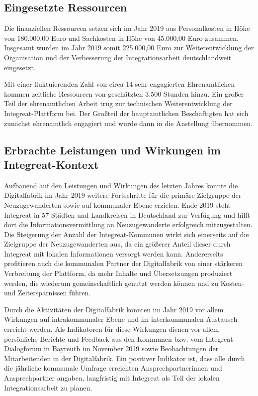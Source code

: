 \documentclass[12pt, a4paper]{article} %
\begin{document}
\hypertarget{eingesetzte-ressourcen}{%
\subsection{Eingesetzte Ressourcen}\label{eingesetzte-ressourcen}}

Die finanziellen Ressourcen setzen sich im Jahr 2019 aus Personalkosten
in Höhe von 180.000,00 Euro und Sachkosten in Höhe von 45.000,00 Euro
zusammen. Insgesamt wurden im Jahr 2019 somit 225.000,00 Euro zur
Weiterentwicklung der Organisation und der Verbesserung der
Integrationsarbeit deutschlandweit eingesetzt.

Mit einer fluktuierenden Zahl von circa 14 sehr engagierten
Ehrenamtlichen kommen zeitliche Ressourcen von geschätzten 3.500 Stunden
hinzu. Ein großer Teil der ehrenamtlichen Arbeit trug zur technischen
Weiterentwicklung der Integreat-Plattform bei. Der Großteil der
hauptamtlichen Beschäftigten hat sich zunächst ehrenamtlich engagiert
und wurde dann in die Anstellung übernommen.

\hypertarget{erbrachte-leistungen-und-wirkungen-im-integreat-kontext}{%
\subsection{Erbrachte Leistungen und Wirkungen im
Integreat-Kontext}\label{erbrachte-leistungen-und-wirkungen-im-integreat-kontext}}

Aufbauend auf den Leistungen und Wirkungen des letzten Jahres konnte die
Digitalfabrik im Jahr 2019 weitere Fortschritte für die primäre
Zielgruppe der Neuzugewanderten sowie auf kommunaler Ebene erzielen.
Ende 2019 steht Integreat in 57 Städten und Landkreisen in Deutschland
zur Verfügung und hilft dort die Informationsvermittlung an
Neuzugewanderte erfolgreich mitzugestalten. Die Steigerung der Anzahl
der Integreat-Kommunen wirkt sich einerseits auf die Zielgruppe der
Neuzugewanderten aus, da ein größerer Anteil dieser durch Integreat mit
lokalen Informationen versorgt werden kann. Andererseits profitieren
auch die kommunalen Partner der Digitalfabrik von einer stärkeren
Verbreitung der Plattform, da mehr Inhalte und Übersetzungen produziert
werden, die wiederum gemeinschaftlich genutzt werden können und zu
Kosten- und Zeitersparnissen führen.

Durch die Aktivitäten der Digitalfabrik konnten im Jahr 2019 vor allem
Wirkungen auf intrakommunaler Ebene und im interkommunalen Austausch
erreicht werden. Als Indikatoren für diese Wirkungen dienen vor allem
persönliche Berichte und Feedback aus den Kommunen bzw. vom
Integreat-Dialogforum in Bayreuth im November 2019 sowie Beobachtungen
der Mitarbeitenden in der Digitalfabrik. Ein positiver Indikator ist,
dass alle durch die jährliche kommunale Umfrage erreichten
Ansprechpartnerinnen und Ansprechpartner angaben, langfristig mit
Integreat als Teil der lokalen Integrationsarbeit zu planen.
\end{document}
